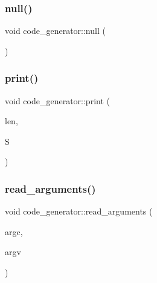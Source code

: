 \mbox{\label{classcode__generator_a181c47b8f842145208524a53d746b21e}} 
\subsubsection{\texorpdfstring{null()}{null()}}
{\footnotesize\ttfamily void code\+\_\+generator\+::null (\begin{DoxyParamCaption}{ }\end{DoxyParamCaption})}

\mbox{\label{classcode__generator_aa865507e914621b77e4aa4461a37945f}} 
\subsubsection{\texorpdfstring{print()}{print()}}
{\footnotesize\ttfamily void code\+\_\+generator\+::print (\begin{DoxyParamCaption}\item[{\mbox{\hyperlink{galois_8h_a09fddde158a3a20bd2dcadb609de11dc}{I\+NT}}}]{len,  }\item[{\mbox{\hyperlink{galois_8h_a09fddde158a3a20bd2dcadb609de11dc}{I\+NT}} $\ast$}]{S }\end{DoxyParamCaption})}

\mbox{\label{classcode__generator_a261aada2343f945b9efe5e5233d72833}} 
\subsubsection{\texorpdfstring{read\+\_\+arguments()}{read\_arguments()}}
{\footnotesize\ttfamily void code\+\_\+generator\+::read\+\_\+arguments (\begin{DoxyParamCaption}\item[{int}]{argc,  }\item[{const char $\ast$$\ast$}]{argv }\end{DoxyParamCaption})}




